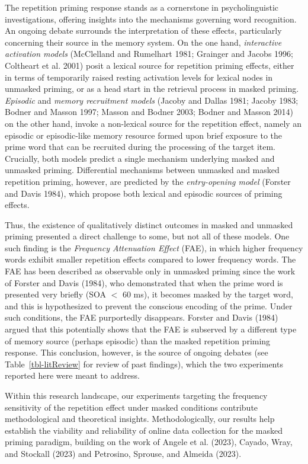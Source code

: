 \documentclass[
]{interact}
\begin{document}
The repetition priming response stands as a cornerstone in
psycholinguistic investigations, offering insights into the mechanisms
governing word recognition. An ongoing debate surrounds the
interpretation of these effects, particularly concerning their source in
the memory system. On the one hand, \emph{interactive activation models}
(McClelland and Rumelhart 1981; Grainger and Jacobs 1996; Coltheart et
al. 2001) posit a lexical source for repetition priming effects, either
in terms of temporarily raised resting activation levels for lexical
nodes in unmasked priming, or as a head start in the retrieval process
in masked priming. \emph{Episodic} and \emph{memory recruitment models}
(Jacoby and Dallas 1981; Jacoby 1983; Bodner and Masson 1997; Masson and
Bodner 2003; Bodner and Masson 2014) on the other hand, invoke a
non-lexical source for the repetition effect, namely an episodic or
episodic-like memory resource formed upon brief exposure to the prime
word that can be recruited during the processing of the target item.
Crucially, both models predict a single mechanism underlying masked and
unmasked priming. Differential mechanisms between unmasked and masked
repetition priming, however, are predicted by the \emph{entry-opening
model} (Forster and Davis 1984), which propose both lexical and episodic
sources of priming effects.

Thus, the existence of qualitatively distinct outcomes in masked and
unmasked priming presented a direct challenge to some, but not all of
these models. One such finding is the \emph{Frequency Attenuation
Effect} (FAE), in which higher frequency words exhibit smaller
repetition effects compared to lower frequency words. The FAE has been
described as observable only in unmasked priming since the work of
Forster and Davis (1984), who demonstrated that when the prime word is
presented very briefly (SOA \(<\) 60 ms), it becomes masked by the
target word, and this is hypothesized to prevent the conscious encoding
of the prime. Under such conditions, the FAE purportedly disappears.
Forster and Davis (1984) argued that this potentially shows that the FAE
is subserved by a different type of memory source (perhaps episodic)
than the masked repetition priming response. This conclusion, however,
is the source of ongoing debates (see Table~\ref{tbl-litReview} for
review of past findings), which the two experiments reported here were
meant to address.

Within this research landscape, our experiments targeting the frequency
sensitivity of the repetition effect under masked conditions contribute
methodological and theoretical insights. Methodologically, our results
help establish the viability and reliability of online data collection
for the masked priming paradigm, building on the work of Angele et al.
(2023), Cayado, Wray, and Stockall (2023) and Petrosino, Sprouse, and
Almeida (2023).
\end{document}

